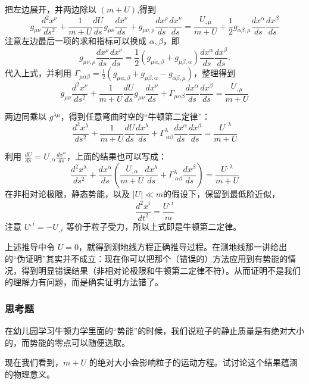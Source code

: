 \documentclass[CJK,13pt]{beamer}
\begin{document}
  \begin{frame}
    把左边展开，并两边除以 $(m+U)$,得到
    $$ g_{\mu\nu}\frac{d^2x^\nu}{ds^2}+\frac{1}{m+U}\frac{dU}{ds}g_{\mu\nu}\frac{dx^\nu}{ds} + g_{\mu\nu,\rho}\frac{dx^\rho}{ds}\frac{dx^\nu}{ds} = \frac{U_{,\mu}}{m+U} + \frac{1}{2}g_{\alpha\beta,\mu}\frac{dx^\alpha}{ds}\frac{dx^\beta}{ds}$$
    注意左边最后一项的求和指标可以换成 $\alpha,\beta$，即
    $$ g_{\mu\nu,\rho}\frac{dx^\rho}{ds}\frac{dx^\nu}{ds} = \frac{1}{2}\left(g_{\mu\alpha,\beta}+g_{\mu\beta,\alpha}\right)\frac{dx^\alpha}{ds}\frac{dx^\beta}{ds}.$$
    代入上式，并利用 $\Gamma_{\mu\alpha\beta} =  \frac{1}{2}\left(g_{\mu\alpha,\beta}+g_{\mu\beta,\alpha}-g_{\alpha\beta,\mu}\right)$，整理得到
    $$ g_{\mu\nu}\frac{d^2x^\nu}{ds^2}+\frac{1}{m+U}\frac{dU}{ds}g_{\mu\nu}\frac{dx^\nu}{ds} + \Gamma_{\mu\alpha\beta}\frac{dx^\alpha}{ds}\frac{dx^\beta}{ds} = \frac{U_{,\mu}}{m+U} $$
    
    两边同乘以 $g^{\lambda\mu}$，得到任意弯曲时空的“牛顿第二定律”：{\blue
    $$ \frac{d^2x^\lambda}{ds^2}+\frac{1}{m+U}\frac{dU}{ds}\frac{dx^\lambda}{ds} + \Gamma^\lambda_{\ \alpha\beta}\frac{dx^\alpha}{ds}\frac{dx^\beta}{ds} = \frac{U^{,\lambda}}{m+U} $$}
  \end{frame}
  

  \begin{frame}
    利用 $\frac{dU}{ds} = U_{,\alpha}\frac{dx^\alpha}{ds}$，上面的结果也可以写成：{\blue
      $$ \frac{d^2x^\lambda}{ds^2}+\frac{dx^\alpha}{ds}\left(\frac{U_{,\alpha}}{m+U}\frac{dx^\lambda}{ds} + \Gamma^\lambda_{\ \alpha\beta}\frac{dx^\beta}{ds}\right) = \frac{U^{,\lambda}}{m+U} $$}
    在非相对论极限，静态势能，以及 $|U|\ll m$的假设下，保留到最低阶近似，
    $$\frac{d^2x^i}{dt^2} = \frac{U^{,i}}{m}$$
    注意 $U^{,i}=-U_{,i}$ 等价于粒子受力，所以上式即是牛顿第二定律。
     
    \skipline
    
    {\scriptsize 上述推导中令 $U=0$，就得到测地线方程正确推导过程。在测地线那一讲给出的“伪证明”其实并不成立：现在你可以把那个（错误的）方法应用到有势能的情况，得到明显错误结果（非相对论极限和牛顿第二定律不符）。从而证明不是我们的理解力有问题，而是确实证明方法错了。}
  \end{frame}


  \begin{frame}
    \frametitle{思考题}
    在幼儿园学习牛顿力学里面的“势能”的时候，我们说粒子的静止质量是有绝对大小的，而势能的零点可以随便选取。

    
    现在我们看到，$m+U$ 的绝对大小会影响粒子的运动方程。试讨论这个结果蕴涵的物理意义。
  \end{frame}
\end{document}
